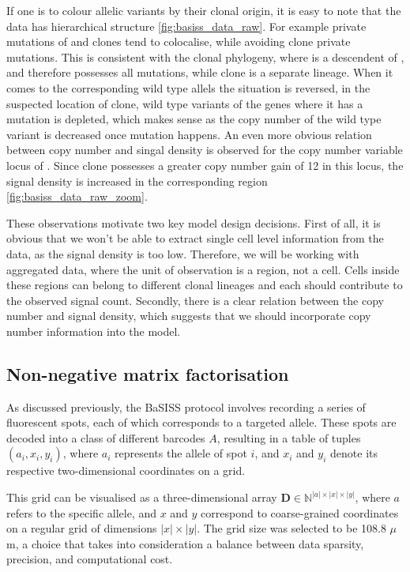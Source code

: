 If one is to colour allelic variants by their clonal origin, it is easy to note that the data has hierarchical structure \cref{fig:basiss_data_raw}. For example private mutations of  and  clones tend to colocalise, while avoiding  clone private mutations. This is consistent with the clonal phylogeny, where  is a descendent of , and therefore possesses all  mutations, while  clone is a separate lineage. When it comes to the corresponding wild type allels the situation is reversed, in the suspected location of  clone, wild type variants of the genes where it has a mutation is depleted, which makes sense as the copy number of the wild type variant is decreased once mutation happens. An even more obvious relation between copy number and singal density is observed for the copy number variable locus of . Since  clone possesses a greater copy number gain of 12 in this locus, the signal density is increased in the corresponding region  \cref{fig:basiss_data_raw_zoom}. 

These observations motivate two key model design decisions. First of all, it is obvious that we won't be able to extract single cell level information from the data, as the signal density is too low. Therefore, we will be working with aggregated data, where the unit of observation is a region, not a cell. Cells inside these regions can belong to different clonal lineages and each should contribute to the observed signal count. Secondly, there is a clear relation between the copy number and signal density, which suggests that we should incorporate copy number information into the model.

\subsection{Non-negative matrix factorisation}
As discussed previously, the \ac{BaSISS} protocol involves recording a series of fluorescent spots, each of which corresponds to a targeted allele. These spots are decoded into a class of different barcodes $A$, resulting in a table of tuples $(a_i, x_i, y_i)$, where $a_i$ represents the allele of spot $i$, and $x_i$ and $y_i$ denote its respective two-dimensional coordinates on a grid.

This grid can be visualised as a three-dimensional array $\mathbf{D} \in \mathbb{N}^{|a| \times |x| \times |y|}$, where $a$ refers to the specific allele, and $x$ and $y$ correspond to coarse-grained coordinates on a regular grid of dimensions $|x| \times |y|$. The grid size was selected to be 108.8 $\mu$ m, a choice that takes into consideration a balance between data sparsity, precision, and computational cost.

